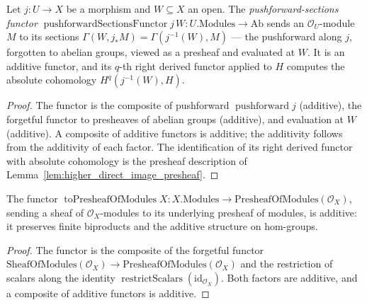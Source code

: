 \begin{lemma}
  \label{lem:pushforward_sections_functor}
  Let \(j : U \to X\) be a morphism and \(W \subseteq X\) an open. The
  \emph{pushforward-sections functor} \(\operatorname{pushforwardSectionsFunctor} j\,W :
  U.\mathrm{Modules} \to \mathrm{Ab}\) sends an \(\mathcal{O}_U\)-module \(M\) to its sections
  \(\Gamma(W, j_* M) = \Gamma(j^{-1}(W), M)\) --- the pushforward along \(j\), forgotten to
  abelian groups, viewed as a presheaf and evaluated at \(W\). It is an additive functor, and
  its \(q\)-th right derived functor applied to \(H\) computes the absolute cohomology
  \(H^q(j^{-1}(W), H)\).
\end{lemma}
\begin{proof}
  The functor is the composite of pushforward \(\operatorname{pushforward} j\) (additive), the
  forgetful functor to presheaves of abelian groups (additive), and evaluation at \(W\)
  (additive). A composite of additive functors is additive; the additivity follows from the additivity of
  each factor. The identification of its right derived functor with
  absolute cohomology is the presheaf description of
  Lemma~\ref{lem:higher_direct_image_presheaf}.
\end{proof}


\begin{lemma}\leanok
  \label{lem:toPresheafOfModules_additive}
  The functor \(\operatorname{toPresheafOfModules} X : X.\mathrm{Modules} \to
  \mathrm{PresheafOfModules}(\mathcal{O}_X)\), sending a sheaf of \(\mathcal{O}_X\)-modules to its
  underlying presheaf of modules, is additive: it preserves finite biproducts and the additive
  structure on hom-groups.
\end{lemma}
\begin{proof}

\leanok
  The functor is the composite of the forgetful functor
  \(\mathrm{SheafOfModules}(\mathcal{O}_X) \to \mathrm{PresheafOfModules}(\mathcal{O}_X)\) and the
  restriction of scalars along the identity \(\operatorname{restrictScalars}(\mathrm{id}_{\mathcal{O}_X})\).
  Both factors are additive, and a composite of additive functors is additive.
\end{proof}

